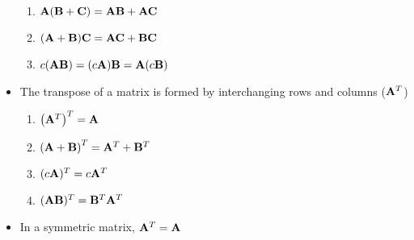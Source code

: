 \documentclass[12pt]{article}
\begin{document}
\begin{itemize}
\begin{enumerate}
      \item $\bold{A}(\bold{B}+\bold{C})=\bold{AB}+\bold{AC}$

      \item $(\bold{A}+\bold{B})\bold{C}=\bold{AC}+\bold{BC}$

      \item $c(\bold{AB})=(c\bold{A})\bold{B}=\bold{A}(c\bold{B})$

    \end{enumerate}

  \item The transpose of a matrix is formed by interchanging rows and columns ($\bold{A}^T$)

    \begin{enumerate}

      \item $\left( \bold{A}^T \right)^T=\bold{A}$

      \item $\left( \bold{A} + \bold{B} \right)^T=\bold{A}^T + \bold{B}^T$

      \item $(c\bold{A})^T=c\bold{A}^T$

      \item $(\bold{AB})^T=\bold{B}^T\bold{A}^T$

    \end{enumerate}

  \item In a symmetric matrix, $\bold{A}^T=\bold{A}$

\end{itemize}
\end{document}
